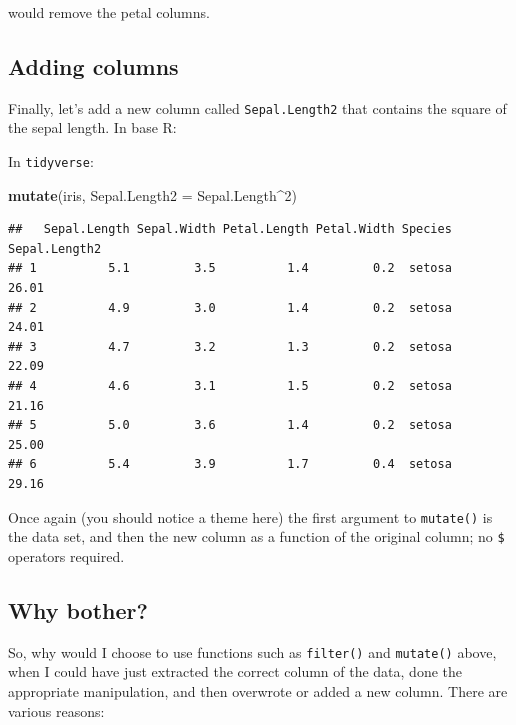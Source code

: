 \documentclass[]{book}
\newenvironment{Shaded}{\begin{snugshade}}{\end{snugshade}}
\newcommand{\KeywordTok}[1]{\textcolor[rgb]{0.13,0.29,0.53}{\textbf{{#1}}}}
\newcommand{\DataTypeTok}[1]{\textcolor[rgb]{0.13,0.29,0.53}{{#1}}}
\newcommand{\DecValTok}[1]{\textcolor[rgb]{0.00,0.00,0.81}{{#1}}}
\newcommand{\StringTok}[1]{\textcolor[rgb]{0.31,0.60,0.02}{{#1}}}
\newcommand{\NormalTok}[1]{{#1}}
\theoremstyle{definition}
\theoremstyle{definition}
\theoremstyle{definition}
\theoremstyle{remark}
\begin{document}
would remove the petal columns.

\subsection{Adding columns}\label{adding-columns}

Finally, let's add a new column called \texttt{Sepal.Length2} that
contains the square of the sepal length. In base R:

\begin{Shaded}
\end{Shaded}

In \texttt{tidyverse}:

\begin{Shaded}
\begin{Highlighting}[]
\KeywordTok{mutate}\NormalTok{(iris, }\DataTypeTok{Sepal.Length2 =} \NormalTok{Sepal.Length^}\DecValTok{2}\NormalTok{)}
\end{Highlighting}
\end{Shaded}

\begin{verbatim}
##   Sepal.Length Sepal.Width Petal.Length Petal.Width Species Sepal.Length2
## 1          5.1         3.5          1.4         0.2  setosa         26.01
## 2          4.9         3.0          1.4         0.2  setosa         24.01
## 3          4.7         3.2          1.3         0.2  setosa         22.09
## 4          4.6         3.1          1.5         0.2  setosa         21.16
## 5          5.0         3.6          1.4         0.2  setosa         25.00
## 6          5.4         3.9          1.7         0.4  setosa         29.16
\end{verbatim}

Once again (you should notice a theme here) the first argument to
\texttt{mutate()} is the data set, and then the new column as a function
of the original column; no \texttt{\$} operators required.

\subsection{Why bother?}\label{why-bother}

So, why would I choose to use functions such as \texttt{filter()} and
\texttt{mutate()} above, when I could have just extracted the correct
column of the data, done the appropriate manipulation, and then
overwrote or added a new column. There are various reasons:
\end{document}
